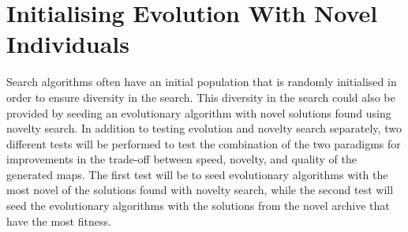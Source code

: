 \section{Initialising Evolution With Novel Individuals}
\label{methodology_evolutionnovelseeds}
Search algorithms often have an initial population that is randomly initialised in order to ensure diversity in the search. This diversity in the search could also be provided by seeding an evolutionary algorithm with novel solutions found using novelty search. In addition to testing evolution and novelty search separately, two different tests will be performed to test the combination of the two paradigms for improvements in the trade-off between speed, novelty, and quality of the generated maps. The first test will be to seed evolutionary algorithms with the most novel of the solutions found with novelty search, while the second test will seed the evolutionary algorithms with the solutions from the novel archive that have the most fitness.